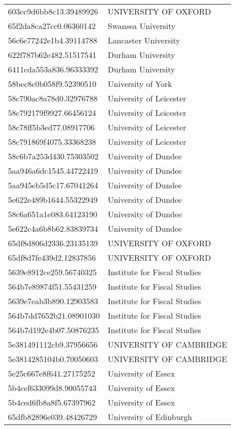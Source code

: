 \begin{tabular}{ll}
603cc9d6bb8c13.39489926 & UNIVERSITY OF OXFORD \\
65f2da8ca27cc0.06360142 & Swansea University \\
56c6e77242e1b4.39114788 & Lancaster University \\
622f787b62e482.51517541 & Durham University \\
6411cda553a836.96333392 & Durham University \\
58bec8c0b058f9.52390510 & University of York \\
58c790ac8a78d0.32976788 & University of Leicester \\
58c792179f9927.66456124 & University of Leicester \\
58c78ff5b3ed77.08917706 & University of Leicester \\
58c791869f4075.33368238 & University of Leicester \\
58c6b7a253d430.75303502 & University of Dundee \\
5aa946a6dc1545.44722419 & University of Dundee \\
5aa945eb5d5c17.67041264 & University of Dundee \\
5e622e489b1644.55322949 & University of Dundee \\
58c6a651a1e083.64123190 & University of Dundee \\
5e622c4a6b8b62.83839734 & University of Dundee \\
65df8d806d2336.23135139 & UNIVERSITY OF OXFORD \\
65df8d7fe439d2.12837856 & UNIVERSITY OF OXFORD \\
5639e8912ce259.56740325 & Institute for Fiscal Studies \\
564b7e89874f51.55431259 & Institute for Fiscal Studies \\
5639e7eab3b890.12903583 & Institute for Fiscal Studies \\
564b7dd7652b21.08901030 & Institute for Fiscal Studies \\
564b7d192e4b07.50876235 & Institute for Fiscal Studies \\
5e381491112cb9.37956656 & UNIVERSITY OF CAMBRIDGE \\
5e3814285104b0.70050603 & UNIVERSITY OF CAMBRIDGE \\
5e25c667e8f641.27175252 & University of Essex \\
5b4cef633099d8.90055743 & University of Essex \\
5b4ced6fb8a8f5.67397962 & University of Essex \\
65dfb82896e039.48426729 & University of Edinburgh \\

\end{tabular}
